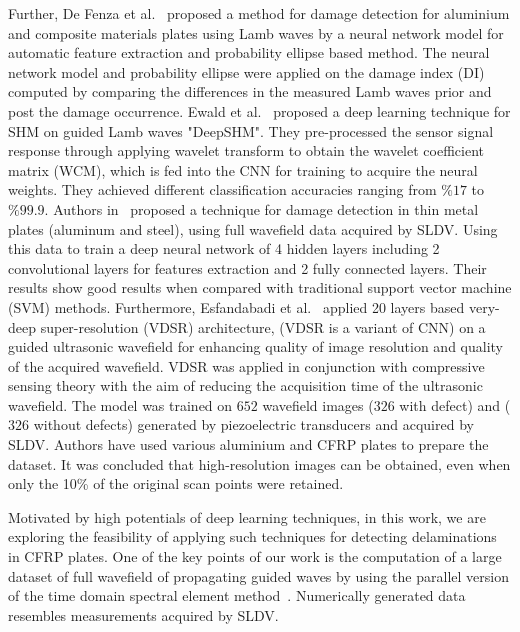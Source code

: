 \documentclass[preprint,9pt]{elsarticle}
\begin{document}
Further, De Fenza et al.~\cite{de2015application} proposed a method for damage detection for aluminium and composite materials plates using Lamb waves by a neural network model for automatic feature extraction and probability ellipse based method. 
The neural network model and probability ellipse were applied on the damage index (DI) computed by comparing the differences in the measured  Lamb waves prior and post the damage occurrence. 
Ewald et al.~\cite{ewald2019deepshm} proposed a deep learning technique for SHM on guided Lamb waves "DeepSHM". 
They pre-processed the sensor signal response through applying wavelet transform to obtain the wavelet coefficient matrix (WCM), which is fed into the CNN for training to acquire the neural weights. 
They achieved different classification accuracies ranging from \(\%17\) to \(\%99.9\).
Authors in~\cite{Melville2018} proposed a technique for damage detection in thin metal plates (aluminum and steel), using full wavefield data acquired by SLDV. 
Using this data to train a deep neural network of 4 hidden layers including 2 convolutional layers for features extraction and 2 fully connected layers. 
Their results show good results when compared with traditional support vector machine (SVM) methods.
Furthermore, Esfandabadi et al.~\cite{esfandabadideep} applied 20 layers based very-deep super-resolution (VDSR) architecture, (VDSR is a variant of CNN) on a guided ultrasonic wavefield for enhancing quality of image resolution and quality of the acquired wavefield. 
VDSR was applied in conjunction with compressive sensing theory with the aim of reducing the acquisition time of the ultrasonic wavefield.
The model was trained on \(652\) wavefield images (\(326\) with defect) and (\(326\) without defects) generated by piezoelectric transducers and acquired by SLDV. 
Authors have used various aluminium and CFRP plates to prepare the dataset.
It was concluded that high-resolution images can be obtained, even when only the 10\% of the original scan points were retained.

Motivated by high potentials of deep learning techniques, in this work, we are exploring the feasibility of applying such techniques for detecting delaminations in CFRP plates. 
One of the key points of our work is the computation of a large dataset of full wavefield of propagating guided waves by using the parallel version of the time domain spectral element method~\cite{Kudela2020}. 
Numerically generated data resembles measurements acquired by SLDV. 
	
\end{document}
